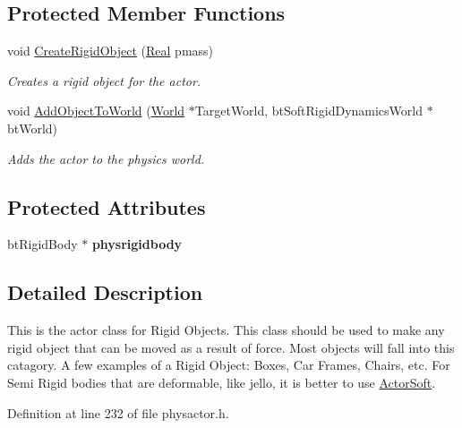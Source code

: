 \subsection*{Protected Member Functions}
\begin{DoxyCompactItemize}
\item 
void \hyperlink{classphys_1_1ActorRigid_a19227c52b972cd96ad69a7b6273e2bbf}{CreateRigidObject} (\hyperlink{namespacephys_af7eb897198d265b8e868f45240230d5f}{Real} pmass)
\begin{DoxyCompactList}\small\item\em Creates a rigid object for the actor. \item\end{DoxyCompactList}\item 
void \hyperlink{classphys_1_1ActorRigid_a3c56eb06fe6a7d468b7a67c45ade7be4}{AddObjectToWorld} (\hyperlink{classphys_1_1World}{World} $\ast$TargetWorld, btSoftRigidDynamicsWorld $\ast$btWorld)
\begin{DoxyCompactList}\small\item\em Adds the actor to the physics world. \item\end{DoxyCompactList}\end{DoxyCompactItemize}
\subsection*{Protected Attributes}
\begin{DoxyCompactItemize}
\item 
\hypertarget{classphys_1_1ActorRigid_a690889f942e177644f4f8521f509c88d}{
btRigidBody $\ast$ {\bfseries physrigidbody}}
\label{d8/d71/classphys_1_1ActorRigid_a690889f942e177644f4f8521f509c88d}

\end{DoxyCompactItemize}


\subsection{Detailed Description}
This is the actor class for Rigid Objects. This class should be used to make any rigid object that can be moved as a result of force. Most objects will fall into this catagory. A few examples of a Rigid Object: Boxes, Car Frames, Chairs, etc. For Semi Rigid bodies that are deformable, like jello, it is better to use \hyperlink{classphys_1_1ActorSoft}{ActorSoft}. 

Definition at line 232 of file physactor.h.




